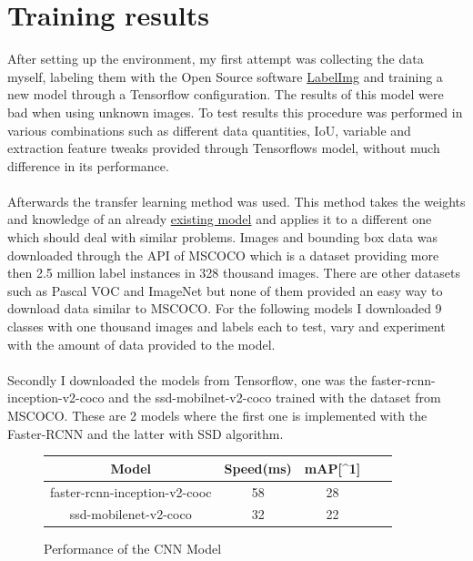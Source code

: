 \section{Training results}
After setting up the environment, my first attempt was collecting the data myself, labeling them with the Open Source software
\href{https://github.com/tzutalin/labelImg}{LabelImg} and training a new model through a Tensorflow configuration. The results of
this model were bad when using unknown images. To test results this procedure was performed in various combinations such as different data quantities, IoU, variable and extraction
feature tweaks provided through Tensorflows model, without much difference in its performance.\\ \\
Afterwards the transfer learning method was used. This method takes the weights and knowledge of an already
\href{https://github.com/tensorflow/models/blob/master/research/object_detection/g3doc/detection_model_zoo.md}{existing model} and applies
it to a different one which should deal with similar problems. 
Images and bounding box data was downloaded through the API of MSCOCO which is a dataset providing more then 2.5 million label
instances in 328 thousand images.\cite{mscoco} There are other datasets such as Pascal VOC and ImageNet but none of them provided an easy way to
download data similar to MSCOCO. For the following models I downloaded 9 classes with one thousand images and labels each to test, vary and experiment
with the amount of data provided to the model.\\\\
Secondly I downloaded the models from Tensorflow, one was the faster-rcnn-inception-v2-coco and the ssd-mobilnet-v2-coco trained with the
dataset from MSCOCO. These are 2 models where the first one is implemented with the Faster-RCNN and the latter with SSD algorithm. \\
\vspace{0.25cm}
\begin{figure}[hbt!]
    \begin{center}
        \begin{tabular}{|c|c|c|c|c|}
            \hline
            Model & Speed(ms) &  mAP[{\textasciicircum}1] \\ \hline
            faster-rcnn-inception-v2-cooc & 58 & 28 \\ \hline
            ssd-mobilenet-v2-coco & 32 & 22 \\ \hline
        \end{tabular}
    \end{center}
    \caption{Performance of the CNN Model}
\end{figure}
